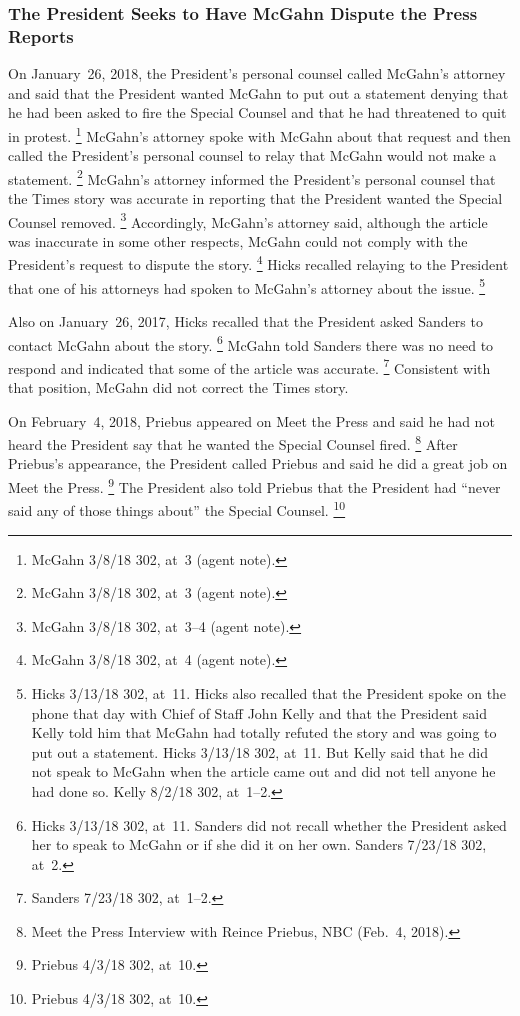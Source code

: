 \subsubsection{The President Seeks to Have McGahn Dispute the Press Reports}

On January~26, 2018, the President's personal counsel called McGahn's attorney and said that the President wanted McGahn to put out a statement denying that he had been asked to fire the Special Counsel and that he had threatened to quit in protest.%
\footnote{McGahn 3/8/18 302, at~3 (agent note).}
McGahn's attorney spoke with McGahn about that request and then called the President's personal counsel to relay that McGahn would not make a statement.%
\footnote{McGahn 3/8/18 302, at~3 (agent note).}
McGahn's attorney informed the President's personal counsel that the Times story was accurate in reporting that the President wanted the Special Counsel removed.%
\footnote{McGahn 3/8/18 302, at~3--4 (agent note).}
Accordingly, McGahn's attorney said, although the article was inaccurate in some other respects, McGahn could not comply with the President's request to dispute the story.%
\footnote{McGahn 3/8/18 302, at~4 (agent note).}
Hicks recalled relaying to the President that one of his attorneys had spoken to McGahn's attorney about the issue.%
\footnote{Hicks 3/13/18 302, at~11.
Hicks also recalled that the President spoke on the phone that day with Chief of Staff John Kelly and that the President said Kelly told him that McGahn had totally refuted the story and was going to put out a statement.
Hicks 3/13/18 302, at~11.
But Kelly said that he did not speak to McGahn when the article came out and did not tell anyone he had done so.
Kelly 8/2/18 302, at~1--2.}

Also on January~26, 2017, Hicks recalled that the President asked Sanders to contact McGahn about the story.%
\footnote{Hicks 3/13/18 302, at~11.
Sanders did not recall whether the President asked her to speak to McGahn or if she did it on her own.
Sanders 7/23/18 302, at~2.}
McGahn told Sanders there was no need to respond and indicated that some of the article was accurate.%
\footnote{Sanders 7/23/18 302, at~1--2.}
Consistent with that position, McGahn did not correct the Times story.

On February~4, 2018, Priebus appeared on Meet the Press and said he had not heard the President say that he wanted the Special Counsel fired.%
\footnote{Meet the Press Interview with Reince Priebus, NBC (Feb.~4, 2018).}
After Priebus's appearance, the President called Priebus and said he did a great job on Meet the Press.%
\footnote{Priebus 4/3/18 302, at~10.}
The President also told Priebus that the President had ``never said any of those things about'' the Special Counsel.%
\footnote{Priebus 4/3/18 302, at~10.}

